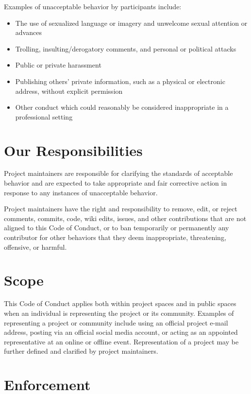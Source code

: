 \documentclass[
  letterpaper,
  oneside,
  open=any]{scrbook}
\providecommand{\tightlist}{%
  \setlength{\itemsep}{0pt}\setlength{\parskip}{0pt}}\usepackage{longtable,booktabs,array}
\begin{document}
Examples of unacceptable behavior by participants include:

\begin{itemize}
\tightlist
\item
  The use of sexualized language or imagery and unwelcome sexual
  attention or advances
\item
  Trolling, insulting/derogatory comments, and personal or political
  attacks
\item
  Public or private harassment
\item
  Publishing others' private information, such as a physical or
  electronic address, without explicit permission
\item
  Other conduct which could reasonably be considered inappropriate in a
  professional setting
\end{itemize}

\section{Our Responsibilities}\label{our-responsibilities}

Project maintainers are responsible for clarifying the standards of
acceptable behavior and are expected to take appropriate and fair
corrective action in response to any instances of unacceptable behavior.

Project maintainers have the right and responsibility to remove, edit,
or reject comments, commits, code, wiki edits, issues, and other
contributions that are not aligned to this Code of Conduct, or to ban
temporarily or permanently any contributor for other behaviors that they
deem inappropriate, threatening, offensive, or harmful.

\section{Scope}\label{scope}

This Code of Conduct applies both within project spaces and in public
spaces when an individual is representing the project or its community.
Examples of representing a project or community include using an
official project e-mail address, posting via an official social media
account, or acting as an appointed representative at an online or
offline event. Representation of a project may be further defined and
clarified by project maintainers.

\section{Enforcement}\label{enforcement}
\end{document}
